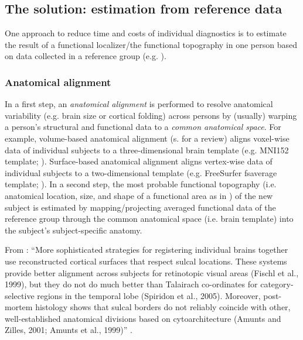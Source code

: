 \subsection{The solution: estimation from reference data}


One approach to reduce time and costs of individual diagnostics is to estimate
the result of a functional localizer/the functional topography in one person
based on data collected in a reference group (e.g. \citet{weiner2018defining}).


\subsubsection{Anatomical alignment}
In a first step, an \textit{anatomical alignment} is performed to resolve
anatomical variability (e.g. brain size or cortical folding) across persons by
(usually) warping a person's structural and functional data to a \textit{common
anatomical space}.
For example, volume-based anatomical alignment (s. \citep{klein2009evaluation}
for a review) aligns voxel-wise data of individual subjects to a
three-dimensional brain template (e.g. MNI152 template;
\citep{fonov2011unbiased}).
Surface-based anatomical alignment \citep{fischl1999cortical} aligns vertex-wise
data of individual subjects to a two-dimensional template (e.g. FreeSurfer
fsaverage template; \citep{fischl1999high}).
In a second step, the most probable functional topography (i.e. anatomical
location, size, and shape of a functional area as in \citep{weiner2018defining})
of the new subject is estimated by mapping/projecting averaged functional data
of the reference group through the common anatomical space (i.e. brain template)
into the subject's subject-specific anatomy.

From \citep{saxe2006divide}: ``More sophisticated strategies for registering
individual brains together use reconstructed cortical surfaces that respect
sulcal locations. These systems provide better alignment across subjects for
retinotopic visual areas (Fischl et al., 1999), but they do not do much better
than Talairach co-ordinates for category-selective regions in the temporal lobe
(Spiridon et al., 2005).  Moreover, post-mortem histology shows that sulcal
borders do not reliably coincide with other, well-established anatomical
divisions based on cytoarchitecture (Amunts and Zilles, 2001; Amunts et al.,
1999)'' \citep{saxe2006divide}.

